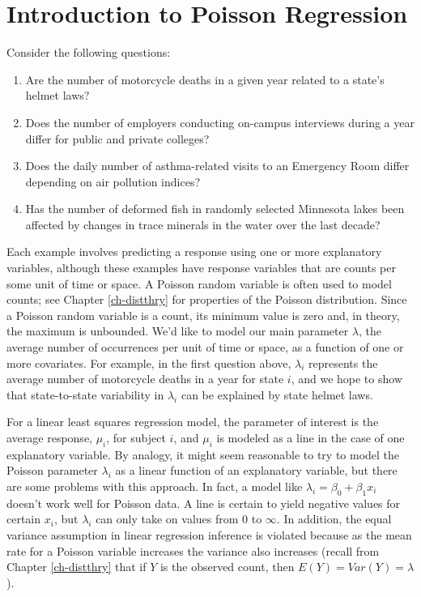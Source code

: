 \documentclass[
]{krantz}
\providecommand{\tightlist}{%
  \setlength{\itemsep}{0pt}\setlength{\parskip}{0pt}}
\begin{document}
\hypertarget{introduction-to-poisson-regression}{%
\section{Introduction to Poisson Regression}\label{introduction-to-poisson-regression}}

Consider the following questions:

\begin{enumerate}
\def\labelenumi{\arabic{enumi}.}
\tightlist
\item
  Are the number of motorcycle deaths in a given year related to a state's helmet laws?
\item
  Does the number of employers conducting on-campus interviews during a year differ for public and private colleges?
\item
  Does the daily number of asthma-related visits to an Emergency Room differ depending on air pollution indices?
\item
  Has the number of deformed fish in randomly selected Minnesota lakes been affected by changes in trace minerals in the water over the last decade?
\end{enumerate}

Each example involves predicting a response using one or more explanatory variables, although these examples have response variables that are counts per some unit of time or space. A Poisson random variable is often used to model counts; see Chapter \ref{ch-distthry} for properties of the Poisson distribution. Since a Poisson random variable is a count, its minimum value is zero and, in theory, the maximum is unbounded. We'd like to model our main parameter \(\lambda\), the average number of occurrences per unit of time or space, as a function of one or more covariates. For example, in the first question above, \(\lambda_i\) represents the average number of motorcycle deaths in a year for state \(i\), and we hope to show that state-to-state variability in \(\lambda_i\) can be explained by state helmet laws.

For a linear least squares regression model, the parameter of interest is the average response, \(\mu_i\), for subject \(i\), and \(\mu_i\) is modeled as a line in the case of one explanatory variable. By analogy, it might seem reasonable to try to model the Poisson parameter \(\lambda_i\) as a linear function of an explanatory variable, but there are some problems with this approach. In fact, a model like \(\lambda_i=\beta_0+\beta_1x_i\) doesn't work well for Poisson data. A line is certain to yield negative values for certain \(x_i\), but \(\lambda_i\) can only take on values from 0 to \(\infty\). In addition, the equal variance assumption in linear regression inference is violated because as the mean rate for a Poisson variable increases the variance also increases (recall from Chapter \ref{ch-distthry} that if \(Y\) is the observed count, then \(E(Y)=Var(Y)=\lambda\)).
\end{document}
